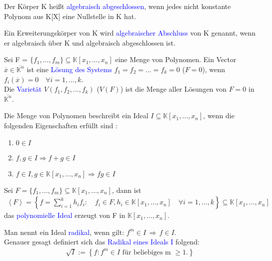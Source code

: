 \begin{definition}
Der Körper K heißt \textcolor{blue}{algebraisch abgeschlossen}, wenn jedes nicht konstante Polynom aus K[X] eine Nullstelle in K hat. \cite{Karpfinger}
\end{definition}

\begin{definition}
Ein Erweiterungskörper von K wird \textcolor{blue}{algebraischer Abschluss} von K genannt, wenn er algebraisch über K und algebraisch abgeschlossen ist. \cite{Karpfinger}
\end{definition}

\begin{definition}
Sei F = $\{f_1,\ldots,f_m\} \subseteq \mathbb{K}[x_1,\ldots,x_n]$ eine Menge von Polynomen. Ein Vector $\overline{x} \in \overline{\mathbb{K}^n}$ ist eine \textcolor{blue}{Lösung des Systems} $f_1 = f_2 = \ldots = f_k=0$ ($F = 0$), wenn $f_i(\overline{x})=0 \quad \forall i=1,\dots,k$.\\
Die \textcolor{blue}{Varietät} $V(f_1,f_2,\ldots,f_k)$ ($V(F)$) ist die Menge aller Lösungen von $F=0$ in $\overline{\mathbb{K}^n}$.\cite{Ausgangsartikel}
\end{definition}

\begin{definition}
Die Menge von Polynomen beschreibt ein Ideal $I \subseteq \mathbb{K}[x_1,\ldots,x_n]$, wenn die folgenden Eigenschaften erfüllt sind \cite{Ausgangsartikel}:
\begin{enumerate}
\item $0 \in I$
\item $f,g \in I \Rightarrow f+g \in I$
\item $f \in I, g \in \mathbb{K}[x_1,\ldots,x_n] \Rightarrow fg \in I$
\end{enumerate}
Sei $F = \{f_1,\ldots,f_m\} \subseteq \mathbb{K}[x_1,\ldots,x_n]$, dann ist
\begin{align*}
\left\langle F \right\rangle = \left\{f = \sum_{i=1}^k h_if_i: \quad f_i \in F, h_i \in \mathbb{K}[x_1,\ldots,x_n] \quad \forall i = 1,\ldots,k\right\} \subseteq \mathbb{K}[x_1,\ldots,x_n]
\end{align*}
das \textcolor{blue}{polynomielle Ideal} erzeugt von F in $\mathbb{K}[x_1,\ldots,x_n]$.
\end{definition}


\begin{definition} \label{Radikal}
Man nennt ein Ideal \textcolor{blue}{radikal}, wenn gilt: $f^m \in I \, \Rightarrow \, f \in I$. \\
Genauer gesagt definiert sich das \textcolor{blue}{Radikal eines Ideals I} folgend: \cite{Ausgangsartikel}
\begin{align*}
\sqrt{I} := \left\{f: f^m \in  I \text{ für beliebiges m } \ge 1.\right\}
\end{align*}
\end{definition}

